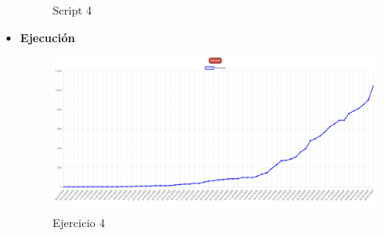 \documentclass{article}
\begin{document}
\begin{itemize}
\begin{figure}[H]
			\caption{Script 4}
		\end{figure}
		\newpage
		\item \textbf{Ejecución}
		\begin{figure}[H]
			\centering
			\includegraphics[width=1\textwidth,keepaspectratio]{img/Ejecucion4.png}
			\caption{Ejercicio 4}
		\end{figure}
	\end{itemize}
\end{document}
